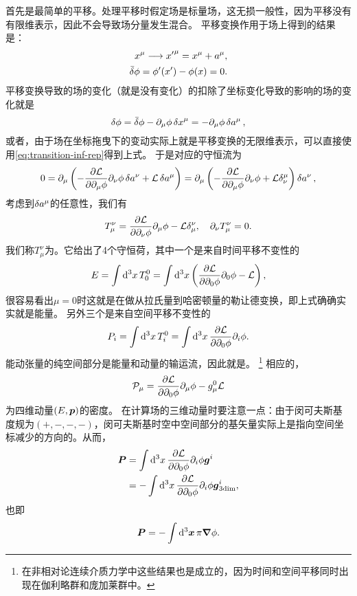 首先是最简单的平移。处理平移时假定场是标量场，这无损一般性，因为平移没有有限维表示，因此不会导致场分量发生混合。
平移变换作用于场上得到的结果是：
\[
    \begin{split}
        x^\mu \longrightarrow {x'}^{\mu} = x^\mu + a^\mu, \\
        \bar{\var}{\phi} = \phi'(x') - \phi(x) = 0.
    \end{split}
\]
平移变换导致的场的变化（就是没有变化）的扣除了坐标变化导致的影响的场的变化就是
\[
    \var{\phi} = \bar{\var}{\phi} - \partial_\mu \phi \var{x}^\mu = - \partial_\mu \phi \var{a^\mu},
\]
或者，由于场在坐标拖曳下的变动实际上就是平移变换的无限维表示，可以直接使用\eqref{eq:transition-inf-rep}得到上式。
于是对应的守恒流为
\[
    0 = \partial_\mu \left( - \pdv{\mathcal{L}}{\partial_\mu \phi} \partial_\nu \phi \var{a^\nu} + \mathcal{L} \var{a^\mu} \right) 
    = \partial_\mu \left( - \pdv{\mathcal{L}}{\partial_\mu \phi} \partial_\nu \phi + \mathcal{L} \delta^\mu_\nu \right) \var{a^\nu},
\]
考虑到$\var{a^\mu}$的任意性，我们有
\begin{equation}
    T_\mu^\nu = \pdv{\mathcal{L}}{\partial_\nu \phi} \partial_\mu \phi - \mathcal{L} \delta^\nu_\mu, \quad \partial_\nu T_\mu^\nu = 0.
\end{equation}
我们称$T^\nu_\mu$为。它给出了4个守恒荷，其中一个是来自时间平移不变性的
\begin{equation}
    E = \int \dd[3]{x} T^0_0 = \int \dd[3]{x} \left( \pdv{\mathcal{L}}{\partial_0 \phi} \partial_0 \phi - \mathcal{L} \right) ,
    \label{eq:field-energy}
\end{equation}
很容易看出$\mu=0$时这就是在做从拉氏量到哈密顿量的勒让德变换，即上式确确实实就是能量。
另外三个是来自空间平移不变性的
\begin{equation}
    P_i = \int \dd[3]{x} T^0_i = \int \dd[3]{x} \pdv{\mathcal{L}}{\partial_0 \phi} \partial_i \phi .
    \label{eq:field-momentum}
\end{equation}
能动张量的纯空间部分是能量和动量的输运流，因此就是。%
\footnote{在非相对论连续介质力学中这些结果也是成立的，因为时间和空间平移同时出现在伽利略群和庞加莱群中。}
相应的，
\begin{equation}
    \mathcal{P}_\mu = \pdv{\mathcal{L}}{\partial_0 \phi} \partial_\mu \phi - g_\mu^0 \mathcal{L}
\end{equation}
为四维动量$(E, \vb*{p})$的密度。
在计算场的三维动量时要注意一点：由于闵可夫斯基度规为$(+, -, -, -)$，闵可夫斯基时空中空间部分的基矢量实际上是指向空间坐标减少的方向的。从而，
\[
    \begin{aligned}
        \vb*{P} &= \int \dd[3]{x} \pdv{\mathcal{L}}{\partial_0 \phi} \partial_i \phi \vb*{g}^i \\
        &= - \int \dd[3]{x} \pdv{\mathcal{L}}{\partial_0 \phi} \partial_i \phi \vb*{g}^i_{\text{3dim}},
    \end{aligned}
\]
也即
\begin{equation}
    \vb*{P} = - \int \dd[3]{\vb*{x}} \pi \grad{\phi}.
\end{equation}

